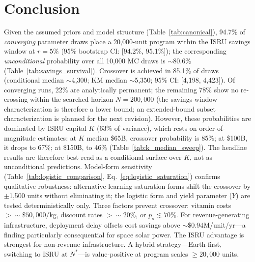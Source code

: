 \section{Conclusion}
\label{sec:conclusion}

Given the assumed priors and model structure (Table~\ref{tab:canonical}), 94.7\% of \emph{converging} parameter draws place a 20{,}000-unit program within the ISRU savings window at $r = 5\%$ (95\% bootstrap CI: [94.2\%, 95.1\%]); the corresponding \emph{unconditional} probability over all 10{,}000 MC draws is ${\sim}$80.6\% (Table~\ref{tab:savings_survival}). Crossover is achieved in 85.1\% of draws (conditional median ${\sim}$4{,}300; KM median ${\sim}$5{,}350; 95\% CI: [4{,}198, 4{,}423]). Of converging runs, 22\% are analytically permanent; the remaining 78\% show no re-crossing within the searched horizon $N = 200{,}000$ (the savings-window characterization is therefore a lower bound; an extended-bound subset characterization is planned for the next revision). However, these probabilities are dominated by ISRU capital $K$ (63\% of variance), which rests on order-of-magnitude estimates: at $K$ median \$65B, crossover probability is 85\%; at \$100B, it drops to 67\%; at \$150B, to 46\% (Table~\ref{tab:k_median_sweep}). The headline results are therefore best read as a conditional surface over $K$, not as unconditional predictions. Model-form sensitivity (Table~\ref{tab:logistic_comparison}, Eq.~\ref{eq:logistic_saturation}) confirms qualitative robustness: alternative learning saturation forms shift the crossover by $\pm$1{,}500 units without eliminating it; the logistic form and yield parameter ($Y$) are tested deterministically only. Three factors prevent crossover: vitamin costs $> {\sim}\$50{,}000$/kg, discount rates $> {\sim}20\%$, or $p_s \lesssim 70\%$. For revenue-generating infrastructure, deployment delay offsets cost savings above ${\sim}\$0.94$M/unit/yr---a finding particularly consequential for space solar power. The ISRU advantage is strongest for non-revenue infrastructure. A hybrid strategy---Earth-first, switching to ISRU at $N^*$---is value-positive at program scales $\geq 20{,}000$ units.

